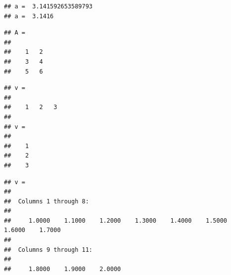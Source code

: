 \documentclass[
]{article}
\newenvironment{Shaded}{\begin{snugshade}}{\end{snugshade}}
\newcommand{\CommentTok}[1]{\textcolor[rgb]{0.56,0.35,0.01}{\textit{#1}}}
\newcommand{\FloatTok}[1]{\textcolor[rgb]{0.00,0.00,0.81}{#1}}
\newcommand{\NormalTok}[1]{#1}
\newcommand{\OperatorTok}[1]{\textcolor[rgb]{0.81,0.36,0.00}{\textbf{#1}}}
\begin{document}
\begin{verbatim}
## a =  3.141592653589793
## a =  3.1416
\end{verbatim}

\begin{Shaded}
\end{Shaded}

\begin{verbatim}
## A =
## 
##    1   2
##    3   4
##    5   6
\end{verbatim}

\begin{Shaded}
\end{Shaded}

\begin{verbatim}
## v =
## 
##    1   2   3
## 
## v =
## 
##    1
##    2
##    3
\end{verbatim}

\begin{Shaded}
\end{Shaded}

\begin{verbatim}
## v =
## 
##  Columns 1 through 8:
## 
##     1.0000    1.1000    1.2000    1.3000    1.4000    1.5000    1.6000    1.7000
## 
##  Columns 9 through 11:
## 
##     1.8000    1.9000    2.0000
\end{verbatim}
\end{document}
